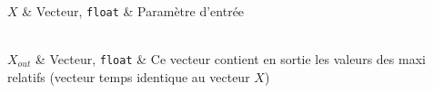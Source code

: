 \begin{tabarg}
\\
\hline
$X$ & Vecteur, {\tt float} & Param\`etre d'entr\'ee\\
\end{tabarg}

\medskip
\begin{tabarg}
\\
\hline
$X_{out}$ & Vecteur, {\tt float} & Ce vecteur contient en sortie les valeurs des maxi relatifs (vecteur temps identique au vecteur $X$)\\
\end{tabarg}
